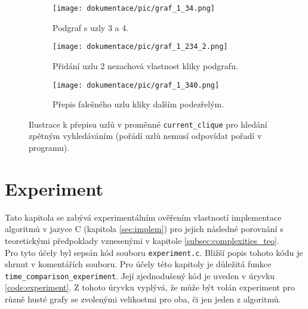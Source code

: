 \documentclass[a4paper]{article}
\begin{document}
        \begin{figure}[h!]
            \centering
            \begin{subfigure}[b]{0.3\textwidth}
                \texttt{[image: dokumentace/pic/graf\_1\_34.png]}
                \caption{Podgraf s uzly 3 a 4.}
            \end{subfigure}
            \begin{subfigure}[b]{0.3\textwidth}
                \texttt{[image: dokumentace/pic/graf\_1\_234\_2.png]}
                \caption{Přidání uzlu 2 nezachová vlastnost kliky podgrafu.}
            \end{subfigure}
            \begin{subfigure}[b]{0.3\textwidth}
                \texttt{[image: dokumentace/pic/graf\_1\_340.png]}
                \caption{Přepis falešného uzlu kliky dalším podezřelým.}
            \end{subfigure}
            \caption{Ilustrace k přepisu uzlů v proměnné \lstinline{current_clique} pro hledání zpětným vyhledáváním (pořádí uzlů nemusí odpovídat pořadí v programu).}
            \label{fig:backtrack_imp}
        \end{figure}


\section{Experiment} \label{sec:experiment}
    Tato kapitola se zabývá experimentálním ověřením vlastností implementace algoritmů v jazyce C (kapitola \ref{sec:implem}) pro jejich následné porovnání s teoretickými předpoklady vznesenými v kapitole \ref{subsec:complexities_teo}.\\

    \noindent
    Pro tyto účely byl sepsán kód souboru \lstinline{experiment.c}. Bližší popis tohoto kódu je shrnut v komentářích souboru. Pro účely této kapitoly je důležitá funkce \lstinline{time_comparison_experiment}. Její zjednodušený kód je uveden v úryvku \ref{code:experiment}. Z tohoto úryvku vyplývá, že může být volán experiment pro různě husté grafy se zvolenými velikostmi pro oba, či jen jeden z algoritmů.\\
\end{document}
